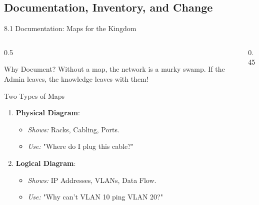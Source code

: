 \documentclass[aspectratio=169]{beamer}  %
\begin{document}
\subsection{Documentation, Inventory, and Change}


\begin{frame}{8.1 Documentation: Maps for the Kingdom}
    \begin{columns}[T]
        \begin{column}{0.5\textwidth}
            \begin{block}{Why Document?}
                \footnotesize
                Without a map, the network is a murky swamp. If the Admin leaves, the knowledge leaves with them!
            \end{block}
            \begin{exampleblock}{Two Types of Maps}
                \footnotesize
                \begin{enumerate}
                    \item \textbf{Physical Diagram}:
                    \begin{itemize}
                        \item \textit{Shows:} Racks, Cabling, Ports.
                        \item \textit{Use:} "Where do I plug this cable?"
                    \end{itemize}
                    \item \textbf{Logical Diagram}:
                    \begin{itemize}
                        \item \textit{Shows:} IP Addresses, VLANs, Data Flow.
                        \item \textit{Use:} "Why can't VLAN 10 ping VLAN 20?"
                    \end{itemize}
                \end{enumerate}
            \end{exampleblock}
        \end{column}
        \begin{column}{0.45\textwidth}
                    \begin{center}
\end{center}
\end{column}
\end{columns}
\end{frame}
\end{document}
